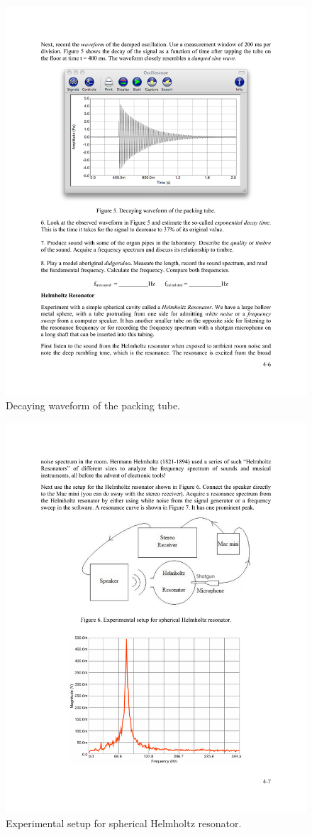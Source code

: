 \documentclass[11pt]{NSF}
\begin{document}
%
\begin{figure}[hbtp]
\begin{center}
\includegraphics[width=.7\textwidth]{fig4_5}
\caption{Decaying waveform of the packing tube.}
\label{f:5} 
\end{center} 
\end{figure}
%
%
\begin{figure}[hbtp]
\begin{center}
\includegraphics[width=.65\textwidth]{fig4_6}
\caption{Experimental setup for spherical Helmholtz resonator.}
\label{f:6} 
\end{center} 
\end{figure}
%
\end{document}
